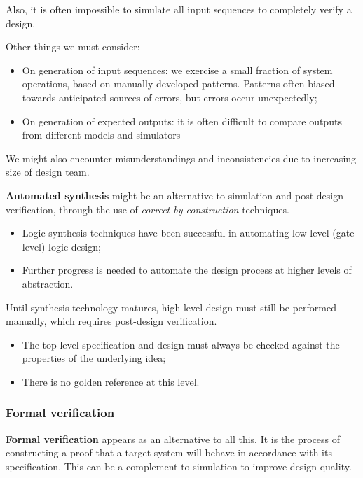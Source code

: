 \documentclass[a4paper,11pt]{article}
\begin{document}
Also, it is often impossible to simulate all input sequences to completely verify a design.

Other things we must consider:
\begin{itemize}
	\item On generation of input sequences:
we exercise a small fraction of system operations, based on manually developed patterns.
Patterns often biased towards anticipated sources of errors, but errors occur unexpectedly;

	\item On generation of expected outputs:
it is often difficult to compare outputs from different models and simulators

\end{itemize}

We might also encounter misunderstandings and inconsistencies due to increasing size of design team.

\par\smallskip

\textbf{Automated synthesis} might be an alternative to simulation and post-design verification, through the use of \textit{correct-by-construction} techniques.

\begin{itemize}
    \item Logic synthesis techniques have been successful in automating low-level (gate-level) logic design;
    \item Further progress is needed to automate the design process at higher levels of abstraction.
\end{itemize}

Until synthesis technology matures, high-level design must still be performed manually, which requires post-design verification.

\begin{itemize}
    \item The top-level specification and design must always be checked against the properties of the underlying idea;
    \item There is no golden reference at this level.
\end{itemize}

\subsubsection{Formal verification}

\textbf{Formal verification} appears as an alternative to all this.
It is the process of constructing a proof that a target system will behave in accordance with its specification.
This can be a complement to simulation to improve design quality.
\end{document}
